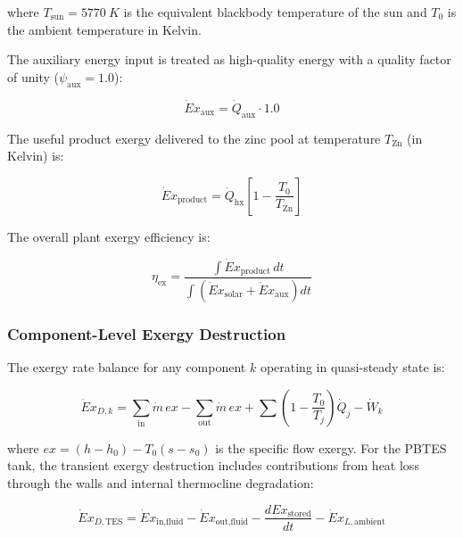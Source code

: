 \documentclass[11pt,review,3p]{elsarticle}
\begin{document}
where $T_{\text{sun}} = \SI{5770}{K}$ is the equivalent blackbody temperature of the sun and $T_0$ is the ambient temperature in Kelvin.

The auxiliary energy input is treated as high-quality energy with a quality factor of unity ($\psi_{\text{aux}} = 1.0$):

\begin{equation}
    \dot{E}x_{\text{aux}} = \dot{Q}_{\text{aux}} \cdot 1.0
    \label{eq:ex_aux}
\end{equation}

The useful product exergy delivered to the zinc pool at temperature $T_{\text{Zn}}$ (in Kelvin) is:

\begin{equation}
    \dot{E}x_{\text{product}} = \dot{Q}_{\text{hx}} \left[ 1 - \frac{T_0}{T_{\text{Zn}}} \right]
    \label{eq:ex_product}
\end{equation}

The overall plant exergy efficiency is:

\begin{equation}
    \eta_{\text{ex}} = \frac{\displaystyle\int \dot{E}x_{\text{product}}\,dt}{\displaystyle\int \left( \dot{E}x_{\text{solar}} + \dot{E}x_{\text{aux}} \right) dt}
    \label{eq:eta_ex}
\end{equation}

\subsubsection{Component-Level Exergy Destruction}
\label{sec:comp_exergy}

The exergy rate balance for any component $k$ operating in quasi-steady state is:

\begin{equation}
    \dot{E}x_{D,k} = \sum_{\text{in}} \dot{m}\,ex - \sum_{\text{out}} \dot{m}\,ex + \sum \left(1 - \frac{T_0}{T_j}\right) \dot{Q}_j - \dot{W}_k
    \label{eq:ex_destruction}
\end{equation}

where $ex = (h - h_0) - T_0(s - s_0)$ is the specific flow exergy. For the PBTES tank, the transient exergy destruction includes contributions from heat loss through the walls and internal thermocline degradation:

\begin{equation}
    \dot{E}x_{D,\text{TES}} = \dot{E}x_{\text{in,fluid}} - \dot{E}x_{\text{out,fluid}} - \frac{dEx_{\text{stored}}}{dt} - \dot{E}x_{L,\text{ambient}}
    \label{eq:ex_tes}
\end{equation}
\end{document}
